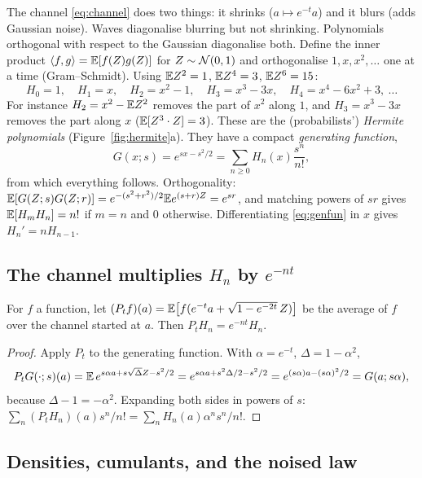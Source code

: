 The channel \eqref{eq:channel} does two things: it shrinks ($a\mapsto e^{-t}a$) and it blurs (adds Gaussian noise).
Waves diagonalise blurring but not shrinking. Polynomials orthogonal with respect to the Gaussian
diagonalise both. Define the inner product $\langle f,g\rangle=\mathbb{E}[f(Z)g(Z)]$ for $Z\sim\mathcal{N}(0,1)$ and orthogonalise
$1,x,x^2,\dots$ one at a time (Gram--Schmidt). Using $\mathbb{E} Z^2=1$, $\mathbb{E} Z^4=3$, $\mathbb{E} Z^6=15$:
\begin{equation}\label{eq:hermite}
  H_0=1,\quad H_1=x,\quad H_2=x^2-1,\quad H_3=x^3-3x,\quad H_4=x^4-6x^2+3,\ \dots
\end{equation}
For instance $H_2=x^2-\mathbb{E} Z^2$ removes the part of $x^2$ along $1$, and $H_3=x^3-3x$ removes the part along
$x$ ($\mathbb{E}[Z^3\cdot Z]=3$). These are the (probabilists') \emph{Hermite polynomials} (Figure~\ref{fig:hermite}a). They
have a compact \emph{generating function},
\begin{equation}\label{eq:genfun}
  G(x;s)=e^{sx-s^2/2}=\sum_{n\ge0}H_n(x)\frac{s^n}{n!},
\end{equation}
from which everything follows. Orthogonality: $\mathbb{E}[G(Z;s)G(Z;r)]=e^{-(s^2+r^2)/2}\mathbb{E} e^{(s+r)Z}=e^{sr}$, and matching
powers of $sr$ gives $\mathbb{E}[H_mH_n]=n!$ if $m=n$ and $0$ otherwise. Differentiating \eqref{eq:genfun} in $x$ gives
$H_n'=nH_{n-1}$.

\subsection{The channel multiplies $H_n$ by $e^{-nt}$}

\begin{proposition}\label{prop:hermite}
For $f$ a function, let $(P_tf)(a)=\mathbb{E}\big[f(e^{-t}a+\sqrt{1-e^{-2t}}\,Z)\big]$ be the average of $f$ over the channel
started at $a$. Then $P_tH_n=e^{-nt}H_n$.
\end{proposition}
\begin{proof}
Apply $P_t$ to the generating function. With $\alpha=e^{-t}$, $\Delta=1-\alpha^2$,
\[
  P_tG(\cdot;s)(a)=\mathbb{E}\,e^{s\alpha a+s\sqrt\Delta Z-s^2/2}=e^{s\alpha a+s^2\Delta/2-s^2/2}=e^{(s\alpha)a-(s\alpha)^2/2}=G(a;s\alpha),
\]
because $\Delta-1=-\alpha^2$. Expanding both sides in powers of $s$: $\sum_n(P_tH_n)(a)s^n/n!=\sum_nH_n(a)\alpha^ns^n/n!$.
\end{proof}

\subsection{Densities, cumulants, and the noised law}

